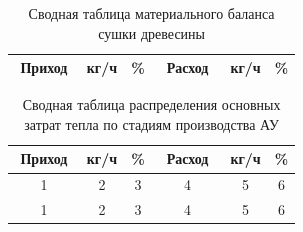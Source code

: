 \begin{table}[h] %
\caption{Сводная таблица материального баланса сушки древесины}
\small
\label{tabular:matbalanses-sushi-agent}
\begin{center}
\begin{tabular}{m{0.25\linewidth}ccm{0.25\linewidth}cc}
\hline
\multicolumn{1}{c}{Приход}&кг/ч&\%&\multicolumn{1}{c}{Расход}&кг/ч&\%\\
\hline

\hline

\end{tabular}
\end{center}
\end{table}

\begin{center}
\small
\begin{longtable}{m{0.25\linewidth}ccm{0.25\linewidth}cc}
\caption{Сводная таблица распределения основных затрат тепла по стадиям производства АУ}
\label{tabular:zatraty-tepla-pyrolisys} \\
\hline
\multicolumn{1}{c}{Приход}&кг/ч&\%&\multicolumn{1}{c}{Расход}&кг/ч&\%\\
\hline
\multicolumn{1}{c}{1}&\multicolumn{1}{c}{2}&\multicolumn{1}{c}{3}&
\multicolumn{1}{c}{4}&\multicolumn{1}{c}{5}&\multicolumn{1}{c}{6}\\
\hline \endfirsthead%
\hline
\multicolumn{1}{c}{1}&\multicolumn{1}{c}{2}&\multicolumn{1}{c}{3}&
\multicolumn{1}{c}{4}&\multicolumn{1}{c}{5}&\multicolumn{1}{c}{6}\\
\hline \endhead

\end{longtable}
\end{center}